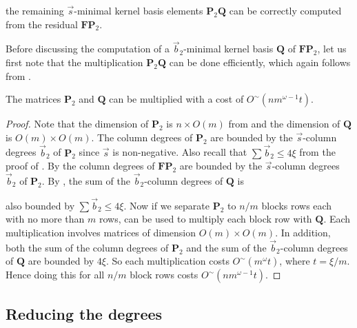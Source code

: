 the remaining $\vec{s}$-minimal kernel basis elements $\mathbf{P}_{2}\mathbf{Q}$
can be correctly computed from the residual $\mathbf{F}\mathbf{P}_{2}$.
\begin{comment}
We still need to show it can be done efficiently. 
\end{comment}
{} Before discussing the computation of a $\vec{b}_{2}$-minimal kernel
basis $\mathbf{Q}$ of $\mathbf{F}\mathbf{P}_{2}$, let us first note
that the multiplication $\mathbf{P}_{2}\mathbf{Q}$ can be done efficiently,
which again follows from . 
\begin{lem}
\label{lem:multiplyingP2Q}The matrices $\mathbf{P}_{2}$ and $\mathbf{Q}$
can be multiplied with a cost of $O^{\sim}\left(nm^{\omega-1}t\right)$.\end{lem}
\begin{proof}
Note that the dimension of $\mathbf{P}_{2}$ is $n\times O(m)$ from
 and
the dimension of $\mathbf{Q}$ is $O\left(m\right)\times O\left(m\right)$.
The column degrees of $\mathbf{P}_{2}$ are bounded by the $\vec{s}$-column
degrees $\vec{b}_{2}$ of $\mathbf{P}_{2}$ since $\vec{s}$ is non-negative.
Also recall that $\sum\vec{b}_{2}\le4\xi$ from the proof of .
By  the column degrees of $\mathbf{F}\mathbf{P}_{2}$
are bounded by the $\vec{s}$-column degrees $\vec{b}_{2}$ of $\mathbf{P}_{2}$.
By , the sum
of the $\vec{b}_{2}$-column degrees of $\mathbf{Q}$ is %
\begin{comment}
bounded by the sum of the column degrees of $\mathbf{F}\mathbf{P}_{2}$,
which is 
\end{comment}
{} also bounded by $\sum\vec{b}_{2}\le4\xi$. Now if we separate $\mathbf{P}_{2}$
to $n/m$ blocks rows each with no more than $m$ rows, 
can be used to multiply each block row with $\mathbf{Q}$. Each multiplication
involves matrices of dimension $O\left(m\right)\times O\left(m\right)$.
In addition, both the sum of the column degrees of $\mathbf{P}_{2}$
and the sum of the $\vec{b}_{2}$-column degrees of $\mathbf{Q}$
are bounded by $4\xi$. So each multiplication costs $O^{\sim}(m^{\omega}t)$,
where $t=\xi/m$. Hence doing this for all $n/m$ block rows costs
$O^{\sim}\left(nm^{\omega-1}t\right)$. 
\end{proof}

\subsection{Reducing the degrees}

